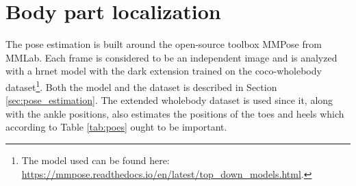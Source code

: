 

%
%





\section{Body part localization} \label{sec:met-loc}
The pose estimation is built around the open-source toolbox MMPose \cite{mmpose} from MMLab. Each frame is considered to be an independent image and is analyzed with a \gls{hrnet} model with the \gls{dark} extension trained on the \gls{coco}-wholebody dataset\footnote{The model used can be found here: \url{https://mmpose.readthedocs.io/en/latest/top_down_models.html}.}. Both the model and the dataset is described in Section \ref{sec:pose_estimation}. The extended wholebody dataset is used since it, along with the ankle positions, also estimates the positions of the toes and heels which according to Table \ref{tab:poes} ought to be important. %

